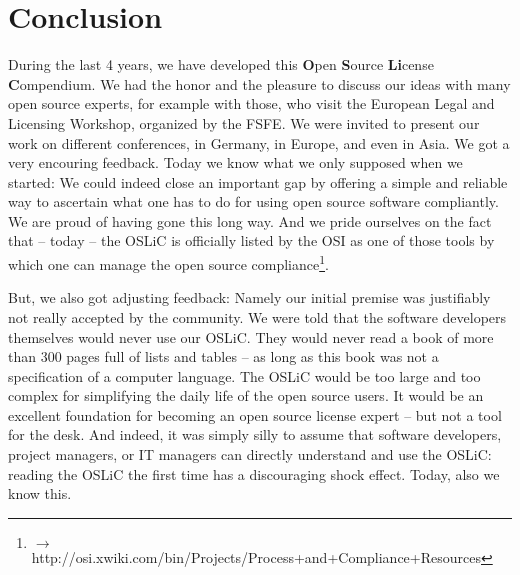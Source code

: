 %
%
%
%
%

\chapter{Conclusion}

During the last 4 years, we have developed this \textbf{O}pen \textbf{S}ource
\textbf{Li}cense \textbf{C}ompendium. We had the honor and the pleasure to
discuss our ideas with many open source experts, for example with those, who
visit the European Legal and Licensing Workshop, organized by the FSFE. We were
invited to present our work on different conferences, in Germany, in Europe, and
even in Asia. We got a very encouring feedback. Today we know what we only
supposed when we started: We could indeed close an important gap by offering a
simple and reliable way to ascertain what one has to do for using open source
software compliantly. We are proud of having gone this long way. And we pride
ourselves on the fact that -- today -- the OSLiC is officially listed by the OSI
as one of those tools by which one can manage the open source
compliance\footnote{$\rightarrow$
http://osi.xwiki.com/bin/Projects/Process+and+Compliance+Resources}.

But, we also got adjusting feedback: Namely our initial premise was justifiably
not really accepted by the community. We were told that the software developers
themselves would never use our OSLiC. They would never read a book of more than
300 pages full of lists and tables -- as long as this book was not a
specification of a computer language. The OSLiC would be too large and too
complex for simplifying the daily life of the open source users. It would be an
excellent foundation for becoming an open source license expert -- but not a
tool for the desk. And indeed, it was simply silly to assume that software
developers, project managers, or IT managers can directly understand and use the
OSLiC: reading the OSLiC the first time has a discouraging shock effect. Today,
also we know this.

